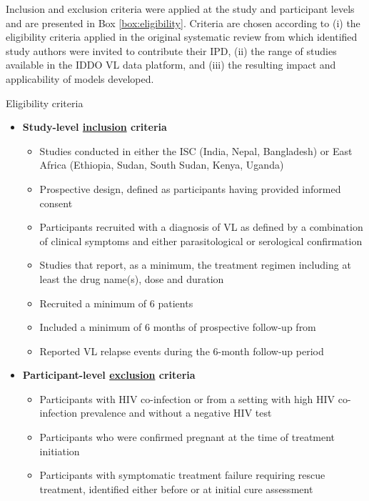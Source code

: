 Inclusion and exclusion criteria were applied at the study and participant levels and are presented in Box \ref{box:eligibility}. Criteria are chosen according to (i) the eligibility criteria applied in the original systematic review from which identified study authors were invited to contribute their IPD\cite{bush2017}, (ii) the range of studies available in the IDDO VL data platform, and (iii) the resulting impact and applicability of models developed.

\begin{mybox}[floatplacement=tb, label=box:eligibility]{Eligibility criteria}
  \begin{itemize}[nosep]
    \item \textbf{Study-level \underline{inclusion} criteria}
          \begin{itemize}
            \item Studies conducted in either the ISC (India, Nepal, Bangladesh) or East Africa (Ethiopia, Sudan, South Sudan, Kenya, Uganda)
            \item Prospective design, defined as participants having provided informed consent
            \item Participants recruited with a diagnosis of VL as defined by a combination of clinical symptoms and either parasitological or serological confirmation
            \item Studies that report, as a minimum, the treatment regimen including at least the drug name(s), dose and duration
            \item Recruited a minimum of 6 patients
            \item Included a minimum of 6 months of prospective follow-up from 
            \item Reported VL relapse events during the 6-month follow-up period
          \end{itemize}
    \item \textbf{Participant-level \underline{exclusion} criteria}
          \begin{itemize}
            \item Participants with HIV co-infection or from a setting with high HIV co-infection prevalence and without a negative HIV test
            \item Participants who were confirmed pregnant at the time of treatment initiation
            \item Participants with symptomatic treatment failure requiring rescue treatment, identified either before or at initial cure assessment
          \end{itemize}
  \end{itemize}
\end{mybox}

